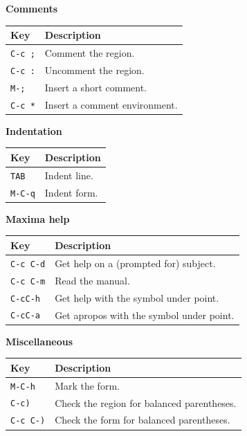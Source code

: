\smallskip

\noindent
\textbf{Comments}

\smallskip

\noindent
\begin{tabular}{p{\firstcol}p{\secondcol}}
\hline
\textbf{Key} & \textbf{Description}\\
\hline
\texttt{C-c ;} & Comment the region.\\
\texttt{C-c :} & Uncomment the region.\\
\texttt{M-;} & Insert a short comment.\\
\texttt{C-c *} & Insert a comment environment.
\end{tabular}


\smallskip

\noindent
\textbf{Indentation}

\smallskip

\noindent
\begin{tabular}{p{\firstcol}p{\secondcol}}
\hline
\textbf{Key} & \textbf{Description}\\
\hline
\texttt{TAB} & Indent line.\\
\texttt{M-C-q} & Indent form.
\end{tabular}


\smallskip

\noindent
\textbf{Maxima help}

\smallskip

\noindent
\begin{tabular}{p{\firstcol}p{\secondcol}}
\hline
\textbf{Key} & \textbf{Description}\\
\hline
\texttt{C-c C-d}
& Get help on a (prompted for) subject.\\
\texttt{C-c C-m}
& Read the manual.\\
\texttt{C-cC-h} & Get help with the symbol under point.\\
\texttt{C-cC-a} & Get apropos with the symbol under point.
\end{tabular}

\smallskip

\noindent
\textbf{Miscellaneous}

\smallskip

\noindent
\begin{tabular}{p{\firstcol}p{\secondcol}}
\hline
\textbf{Key} & \textbf{Description}\\
\hline
\texttt{M-C-h} & Mark the form.\\
\texttt{C-c)} & Check the region for balanced parentheses.\\
\texttt{C-c C-)} & Check the form for balanced parentheses.
\end{tabular}

